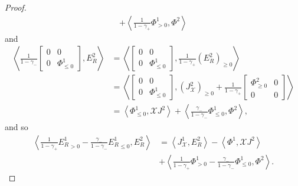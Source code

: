 \documentclass{amsart}
\theoremstyle{definition}
\theoremstyle{remark}
\numberwithin{equation}{section}
\numberwithin{theorem}{section}
\begin{document}
\begin{proof}
\begin{align*}
+ \left \langle
\frac {1}{1-\gamma_+}{\Phi}^1_{>0},
{\Phi}^2
 \right \rangle
\end{align*}
and
\begin{align*}
\left \langle  \frac {1}{1-\gamma_-}
\left [\begin{array}{cc} 0 & 0 \\
0 & {\Phi}^1_{\leq 0}\end{array}\right], E_R^2
 \right \rangle &=
\left \langle 
\left [\begin{array}{cc} 0 & 0 \\
0 & {\Phi}^1_{\leq 0}\end{array}\right],  \frac {1}{1-\gamma_+}( E_R^2)_{\geq 0}
 \right \rangle\\
& = \left \langle \left [\begin{array}{cc} 0 & 0 \\
0 & {\Phi}^1_{\leq 0}\end{array}\right], (J^2_{{\mathcal X}})_{\geq 0}+
\frac {1}{1-\gamma_+}
\left [\begin{array}{cc}  {\Phi}^2_{\geq 0} & 0 \\ 0 & 0\end{array}\right]
 \right \rangle
\\
&=  \left \langle {\Phi}^1_{\leq 0}, {{\mathcal X}} J^2\right \rangle
+ \left \langle
\frac {\gamma_-}{1-\gamma_-}{\Phi}^1_{\leq 0},
{\Phi}^2 \right \rangle,
\end{align*}
and so
\begin{equation}\label{4}
 \begin{aligned}
\left \langle  \frac{1}{1-\gamma_+} 
{E^1_R}_{>0} - \frac{\gamma_-}{1-\gamma_-}{E^1_R}_{\leq 0}, E_R^2 \right \rangle &=
\left \langle  J^1_{{\mathcal X}}, E_R^2 \right \rangle - \left \langle  {\Phi}^1, {{\mathcal X}} J^2\right\rangle\\
& +\left \langle  
 \frac{1}{1-\gamma_+}{\Phi}^1_{> 0}
- \frac{\gamma_-}{1-\gamma_-}{\Phi}^1_{\leq 0},  {\Phi}^2 
\right\rangle.  
\end{aligned}
\end{equation}


\end{proof}
\end{document}
